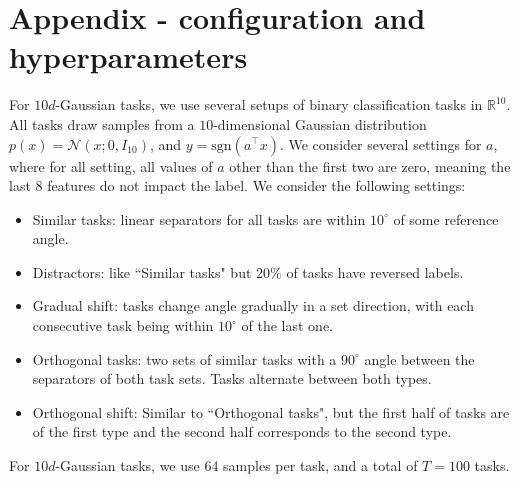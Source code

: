 \documentclass{article}
\theoremstyle{plain}
\theoremstyle{definition}
\theoremstyle{remark}
\begin{document}
\section{Appendix - configuration and hyperparameters} \label{append:hyperparam}

For $10d$-Gaussian tasks, we use several setups of binary classification tasks in $\mathbb{R}^{10}$. All tasks draw samples from a $10$-dimensional Gaussian distribution $p(x) = \mathcal{N}(x;0,I_{10})$, and $y=\mathrm{sgn}(a^\top x)$. 
We consider several settings for $a$, where for all setting, all values of $a$ other than the first two are zero, meaning the last $8$ features do not impact the label.
We consider the following settings:
\begin{itemize}
    \item Similar tasks: linear separators for all tasks are within $10^\circ$ of some reference angle.
    \item Distractors: like ``Similar tasks" but $20\%$  of tasks have reversed labels.
    \item Gradual shift: tasks change angle gradually in a set direction, with each consecutive task being within $10^\circ$ of the last one.
    \item Orthogonal tasks: two sets of similar tasks with a $90^\circ$ angle between the separators of both task sets. Tasks alternate between both types.
    \item Orthogonal shift: Similar to ``Orthogonal tasks", but the first half of tasks are of the first type and the second half corresponds to the second type.
\end{itemize}

For $10d$-Gaussian tasks, we use $64$ samples per task, and a total of $T=100$ tasks.
\end{document}

